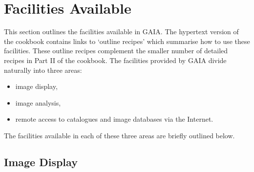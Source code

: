 \documentclass[twoside,11pt]{article}
\newcommand{\xlabel}[1]{}
\renewcommand{\_}{\texttt{\symbol{95}}}
\begin{document}
\section{\xlabel{FACIL}\label{FACIL}Facilities Available}

This section outlines the facilities available in GAIA.  The hypertext
version of the cookbook contains links to `outline recipes' which
summarise how to use these facilities.  These outline recipes complement
the smaller number of detailed recipes in Part II of the cookbook.
The facilities provided by GAIA divide naturally into three areas:

\begin{itemize}

  \item image display,

  \item image analysis,

  \item remote access to catalogues and image databases via the Internet.

\end{itemize}

The facilities available in each of these three areas are briefly outlined
below.

\subsection{Image Display}
\end{document}
